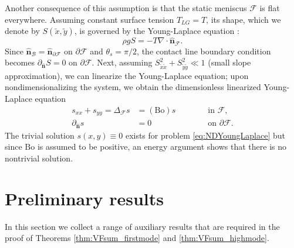 \documentclass[letterpaper, 12pt]{amsart}
\newcommand{\bond}{\mathrm{Bo}}
\newcommand{\B}{\mathcal{B}}
\newcommand{\F}{\mathcal{F}}
\newcommand{\n}{\mathbf{\hat{n}}}
\begin{document}
Another consequence of this assumption is that the static meniscus $\F$ is flat everywhere. Assuming constant surface tension $T_{LG} = T$, its shape, which we denote by $S(\tilde x,\tilde y)$, is governed by the Young-Laplace equation \cite{Finn:1986aa, Bush:2013aa}:
\begin{equation}
\label{eq:YoungLaplace} \rho gS = -T\nabla\cdot\n_\F. 
\end{equation}
Since $\n_\B = \n_{\partial\F}$ on $\partial\F$ and $\theta_s=\pi/2$, the contact line boundary condition becomes $\partial_\n S=0$ on $\partial\F$. Next, assuming $S_{\tilde x\tilde x}^2 + S_{\tilde y\tilde y}^2\ll 1$ (small slope approximation), we can linearize the Young-Laplace equation; upon nondimensionalizing the system, we obtain the dimensionless linearized Young-Laplace equation
\begin{subequations} \label{eq:NDYoungLaplace}
\begin{alignat}{2}
s_{xx} + s_{yy} = \Delta_\F s & = (\bond)s && \qquad\textrm{ in }\F, \\
\partial_\n s & = 0 && \qquad\textrm{ on }\partial\F.
\end{alignat}
\end{subequations}
The trivial solution $s(x,y)\equiv 0$ exists for problem \eqref{eq:NDYoungLaplace} but since $\bond$ is assumed to be positive, an energy argument shows that there is no nontrivial solution.


\section{Preliminary results} \label{sec:Prelim}
In this section we collect a range of auxiliary results that are required in the proof of Theorems \ref{thm:VFsum_firstmode} and \ref{thm:VFsum_highmode}. 
\end{document}
